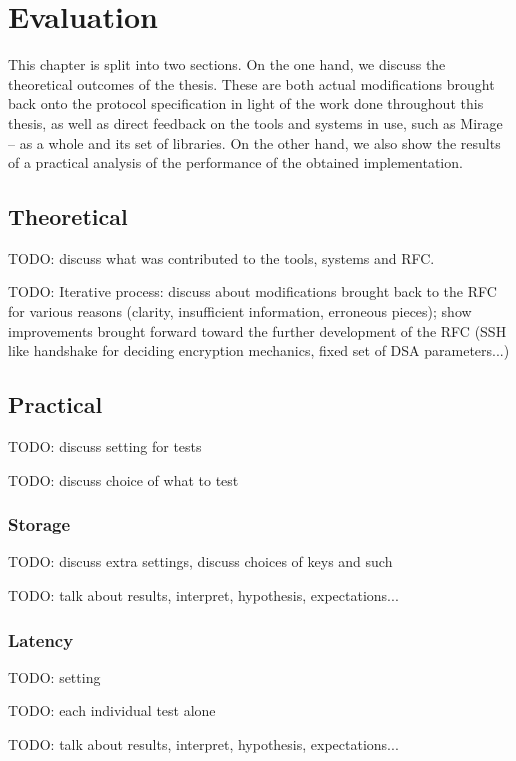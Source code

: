 \chapter{Evaluation} \label{chapter:evaluation}
This chapter is split into two sections.
On the one hand, we discuss the theoretical outcomes of the thesis.
These are both actual modifications brought back onto the protocol specification in light of the work done throughout this thesis, as well as direct feedback on the tools and systems in use, such as Mirage -- as a whole and its set of libraries.
On the other hand, we also show the results of a practical analysis of the performance of the obtained implementation.

\section{Theoretical}
TODO: discuss what was contributed to the tools, systems and RFC.

TODO: Iterative process: discuss about modifications brought back to the RFC for various reasons (clarity, insufficient information, erroneous pieces); show improvements brought forward toward the further development of the RFC (SSH like handshake for deciding encryption mechanics, fixed set of DSA parameters...)

\section{Practical}
TODO: discuss setting for tests

TODO: discuss choice of what to test

\subsection{Storage}
TODO: discuss extra settings, discuss choices of keys and such

TODO: talk about results, interpret, hypothesis, expectations...

\subsection{Latency}
TODO: setting

TODO: each individual test alone

TODO: talk about results, interpret, hypothesis, expectations...
